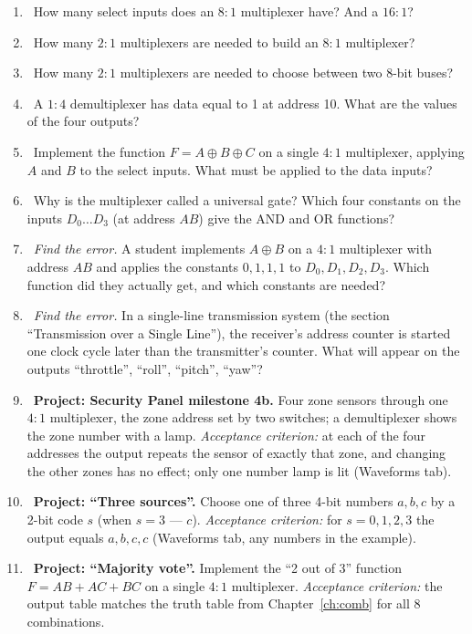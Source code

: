 \begin{taskbox}
\begin{enumerate}
  \item {}~How many select inputs does an $8:1$ multiplexer have? And a $16:1$?
  \item {}~How many $2:1$ multiplexers are needed to build an $8:1$ multiplexer?
  \item {}~How many $2:1$ multiplexers are needed to choose between two 8-bit buses?
  \item {}~A $1:4$ demultiplexer has data equal to 1 at address 10. What are the values of the four outputs?
  \item {}~Implement the function $F = A\oplus B\oplus C$ on a single $4:1$ multiplexer, applying $A$ and $B$ to the select inputs. What must be applied to the data inputs?
  \item {}~Why is the multiplexer called a universal gate? Which four constants on the inputs $D_0\ldots D_3$ (at address $AB$) give the AND and OR functions?
  \item {}~\emph{Find the error.} A student implements $A\oplus B$ on a $4:1$ multiplexer with address $AB$ and applies the constants $0,1,1,1$ to $D_0,D_1,D_2,D_3$. Which function did they actually get, and which constants are needed?
  \item {}~\emph{Find the error.} In a single-line transmission system (the section ``Transmission over a Single Line''), the receiver's address counter is started one clock cycle later than the transmitter's counter. What will appear on the outputs ``throttle'', ``roll'', ``pitch'', ``yaw''?
  \item {}~\textbf{Project: Security Panel milestone 4b.} Four zone sensors through one $4:1$ multiplexer, the zone address set by two switches; a demultiplexer shows the zone number with a lamp. \emph{Acceptance criterion:} at each of the four addresses the output repeats the sensor of exactly that zone, and changing the other zones has no effect; only one number lamp is lit (Waveforms tab).
  \item {}~\textbf{Project: ``Three sources''.} Choose one of three 4-bit numbers $a,b,c$ by a 2-bit code $s$ (when $s=3$ --- $c$). \emph{Acceptance criterion:} for $s=0,1,2,3$ the output equals $a,b,c,c$ (Waveforms tab, any numbers in the example).
  \item {}~\textbf{Project: ``Majority vote''.} Implement the ``2 out of 3'' function $F=AB+AC+BC$ on a single $4:1$ multiplexer. \emph{Acceptance criterion:} the output table matches the truth table from Chapter~\ref{ch:comb} for all 8 combinations.
\end{enumerate}
\end{taskbox}

